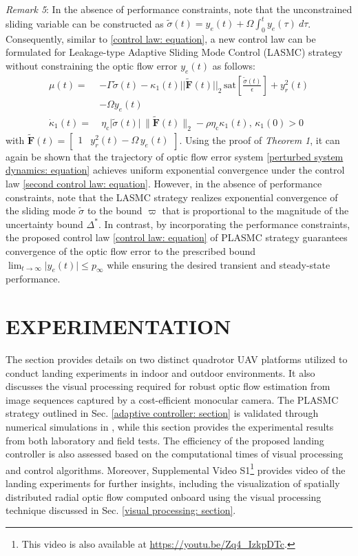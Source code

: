\documentclass{IEEEtaes}
\begin{document}
\textit{Remark 5}: In the absence of performance constraints, note that the unconstrained sliding variable can be constructed as $\tilde{\sigma}(t) = y_e(t) + \Omega \int_0^t y_e(\tau)~d\tau$. Consequently, similar to \eqref{control law: equation}, a new control law can be formulated for Leakage-type Adaptive Sliding Mode Control (LASMC) strategy without constraining the optic flow error $y_e(t)$ as follows: 
\begin{align} 
\label{second control law: equation}
    \mu(t) =& -\Gamma\tilde{\sigma}(t)-\kappa_1(t)||\tilde{\boldsymbol{F}}(t)||_2\,\text{sat}\left[\frac{\tilde{\sigma}(t)}{\epsilon}\right]+y_r^2(t)\nonumber\\
    &-\Omega y_e(t) \nonumber\\
   \dot{\kappa}_1(t) =&~\eta_{\text{c}} \lvert \tilde{\sigma}(t) \rvert \,\lVert \tilde{\boldsymbol{F}}(t) \rVert_2 - \rho \eta_{\text{c}} \kappa_1(t),\,\kappa_1(0) > 0
\end{align}
with $\tilde{\boldsymbol{F}}(t)=\begin{bmatrix}
1 & y_r^2(t) {-} \Omega\,y_e(t) \end{bmatrix}$. Using the proof of \textit{Theorem 1}, it can again be shown that the trajectory of optic flow error system \eqref{perturbed system dynamics: equation} achieves uniform exponential convergence under the control law \eqref{second control law: equation}. However, in the absence of performance constraints, note that the LASMC strategy realizes exponential convergence of the sliding mode $\tilde{\sigma}$ to the bound $\varpi$ that is proportional to the magnitude of the uncertainty bound $\Delta^{*}$. In contrast, by incorporating the performance constraints, the proposed control law \eqref{control law: equation} of PLASMC strategy guarantees convergence of the optic flow error to the prescribed bound $\lim_{t\rightarrow\infty}\lvert y_e(t) \rvert\leq p_{\infty}$ while ensuring the desired transient and steady-state performance.

\section{EXPERIMENTATION}
\label{experimentation: section}
The section provides details on two distinct quadrotor UAV platforms utilized to conduct landing experiments in indoor and outdoor environments.
It also discusses the visual processing required for robust optic flow estimation from image sequences captured by a cost-efficient monocular camera.
The PLASMC strategy outlined in Sec. \ref{adaptive controller: section} is validated through numerical simulations in \cite{singhal2023}, while this section provides the experimental results from both laboratory and field tests.
The efficiency of the proposed landing controller is also assessed based on the computational times of visual processing and control algorithms.
Moreover, Supplemental Video S1\footnote{This video is also available at \url{https://youtu.be/Zq4_IzkpDTc}.} provides video of the landing experiments for further insights, including the visualization of spatially distributed radial optic flow computed onboard using the visual processing technique discussed in Sec. \ref{visual processing: section}.
\end{document}
